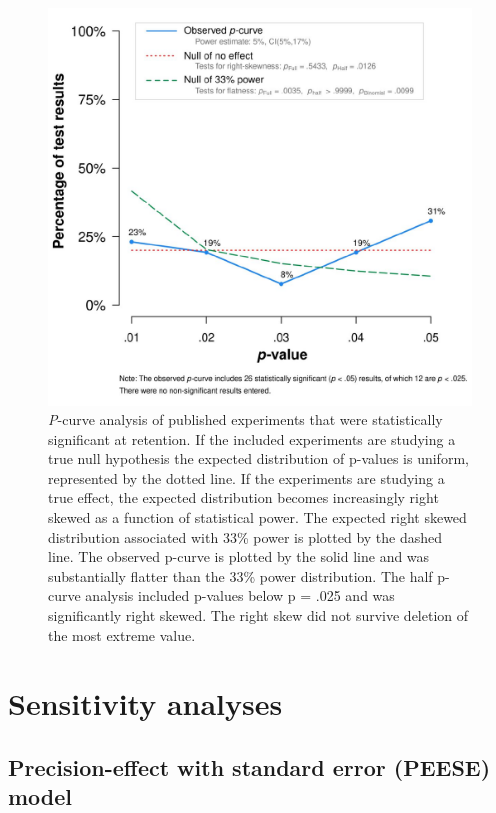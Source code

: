 \documentclass[
  english,
  man, donotrepeattitle,floatsintext]{apa7}
\begin{document}
\begin{figure}

{\centering \includegraphics[width=0.9\linewidth]{../../figs/fig5} 

}

\caption{\emph{P}-curve analysis of published experiments that were statistically significant at retention. If the included experiments are studying a true null hypothesis the expected distribution of p-values is uniform, represented by the dotted line. If the experiments are studying a true effect, the expected distribution becomes increasingly right skewed as a function of statistical power. The expected right skewed distribution associated with 33\% power is plotted by the dashed line. The observed p-curve is plotted by the solid line and was substantially flatter than the 33\% power distribution. The half p-curve analysis included p-values below p = .025 and was significantly right skewed. The right skew did not survive deletion of the most extreme value.}\label{fig:fig5}
\end{figure}

\hypertarget{sensitivity-analyses-1}{%
\section{Sensitivity analyses}\label{sensitivity-analyses-1}}

\hypertarget{precision-effect-with-standard-error-peese-model}{%
\subsection{Precision-effect with standard error (PEESE) model}\label{precision-effect-with-standard-error-peese-model}}
\end{document}
